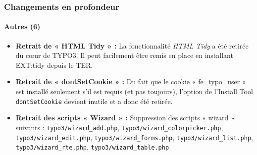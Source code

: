 \begin{frame}[fragile]
	\frametitle{Changements en profondeur}
	\framesubtitle{Autres (6)}

	\begin{itemize}

		\item \textbf{Retrait de « HTML Tidy » :}\newline
			\small
				La fonctionnalité \textit{HTML Tidy} a été retirée du cœur de TYPO3. Il peut facilement être remis en place en installant EXT:tidy depuis le TER.
			\normalsize

		\item \textbf{Retrait de « dontSetCookie » :}\newline
			\small
				Du fait que le cookie « fe\_typo\_user » est installé seulement s'il est requis (et pas toujours), l'option de l'Install Tool \texttt{dontSetCookie} devient inutile et a donc été retirée.
			\normalsize

		\item \textbf{Retrait des scripts « Wizard » :}\newline
			\small
				Suppression des scripts « wizard » suivants :
				\texttt{typo3/wizard\_add.php}, \texttt{typo3/wizard\_colorpicker.php}, \texttt{typo3/wizard\_edit.php}, \texttt{typo3/wizard\_forms.php}, \texttt{typo3/wizard\_list.php}, \texttt{typo3/wizard\_rte.php}, \texttt{typo3/wizard\_table.php}
			\normalsize

	\end{itemize}
	
\end{frame}


